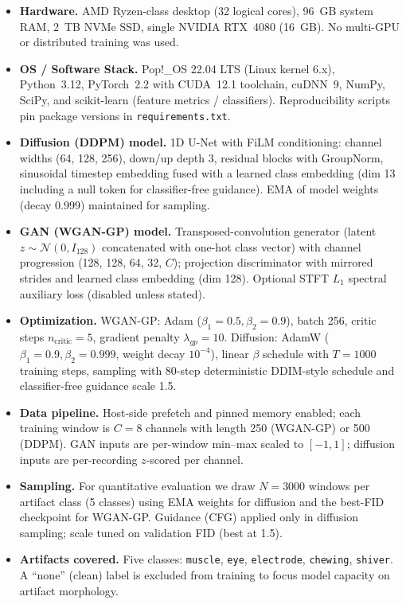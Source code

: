 \documentclass{article}
\begin{document}
\begin{itemize}
    \item \textbf{Hardware.} AMD Ryzen-class desktop (32 logical cores), 96~GB system RAM, 2~TB NVMe SSD, single NVIDIA RTX~4080 (16~GB). No multi-GPU or distributed training was used.
    \item \textbf{OS / Software Stack.} Pop!\_OS 22.04 LTS (Linux kernel 6.x), Python~3.12, PyTorch~2.2 with CUDA~12.1 toolchain, cuDNN~9, NumPy, SciPy, and scikit-learn (feature metrics / classifiers). Reproducibility scripts pin package versions in \texttt{requirements.txt}.
    \item \textbf{Diffusion (DDPM) model.} 1D U-Net with FiLM conditioning: channel widths (64, 128, 256), down/up depth 3, residual blocks with GroupNorm, sinusoidal timestep embedding fused with a learned class embedding (dim 13 including a null token for classifier-free guidance). EMA of model weights (decay 0.999) maintained for sampling.
    \item \textbf{GAN (WGAN-GP) model.} Transposed-convolution generator (latent $z \sim \mathcal{N}(0,I_{128})$ concatenated with one-hot class vector) with channel progression (128, 128, 64, 32, $C$); projection discriminator with mirrored strides and learned class embedding (dim 128). Optional STFT $L_1$ spectral auxiliary loss (disabled unless stated).
    \item \textbf{Optimization.} WGAN-GP: Adam ($\beta_1{=}0.5, \beta_2{=}0.9$), batch 256, critic steps $n_\text{critic}{=}5$, gradient penalty $\lambda_{gp}{=}10$. Diffusion: AdamW ($\beta_1{=}0.9, \beta_2{=}0.999$, weight decay $10^{-4}$), linear $\beta$ schedule with $T{=}1000$ training steps, sampling with 80-step deterministic DDIM-style schedule and classifier-free guidance scale 1.5.
    \item \textbf{Data pipeline.} Host-side prefetch and pinned memory enabled; each training window is $C{=}8$ channels with length 250 (WGAN-GP) or 500 (DDPM). GAN inputs are per-window min--max scaled to $[-1,1]$; diffusion inputs are per-recording $z$-scored per channel.
    \item \textbf{Sampling.} For quantitative evaluation we draw $N{=}3000$ windows per artifact class (5 classes) using EMA weights for diffusion and the best-FID checkpoint for WGAN-GP. Guidance (CFG) applied only in diffusion sampling; scale tuned on validation FID (best at 1.5).
    \item \textbf{Artifacts covered.} Five classes: \texttt{muscle}, \texttt{eye}, \texttt{electrode}, \texttt{chewing}, \texttt{shiver}. A ``none'' (clean) label is excluded from training to focus model capacity on artifact morphology.

\end{itemize}
\end{document}
